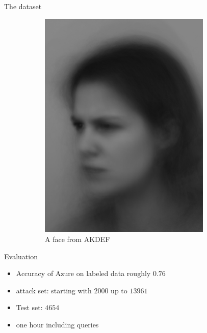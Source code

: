 \documentclass[10pt]{beamer}
\begin{document}
\begin{frame}[fragile]{The dataset}
\begin{figure}[h!]
\begin{subfigure}[c]{0.45\textwidth}
            \includegraphics[width=0.9\textwidth]{exercise_3/paper/images/FANHL.JPG}
            \caption{A face from AKDEF}
            \label{fig:AKDEF_face}
        \end{subfigure}
        \caption{}
        \label{fig:faces}
    \end{figure}
\end{frame}
\begin{frame}[fragile]{Evaluation}
\begin{itemize}
    \item Accuracy of Azure on labeled data roughly $0.76$
    \item attack set: starting with $2000$ up to $13961$
    \item Test set: $4654$
    \item one hour including queries
\end{itemize}
\end{frame}
\end{document}
